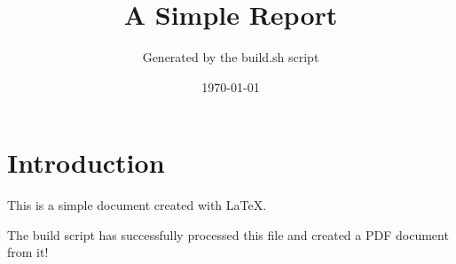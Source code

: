 \documentclass{article}
\title{A Simple Report}
\author{Generated by the build.sh script}
\date{\today}
\begin{document}
\maketitle

\section{Introduction}

This is a simple document created with LaTeX.

The build script has successfully processed this file and created a PDF document from it!
\end{document}
